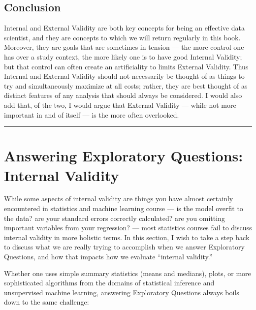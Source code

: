 \documentclass[letterpaper,10pt,english]{jupyterBook}
\begin{document}
\section{Conclusion}
\label{\detokenize{30_questions/15_answering_exploratory_questions:conclusion}}
\sphinxAtStartPar
Internal and External Validity are both key concepts for being an effective data scientist, and they are concepts to which we will return regularly in this book. Moreover, they are goals that are sometimes in tension — the more control one has over a study context, the more likely one is to have good Internal Validity; but that control can often create an artificiality to limits External Validity. Thus Internal and External Validity should not necessarily be thought of as things to try and simultaneously maximize at all costs; rather, they are best thought of as distinct features of any analysis that should always be considered. I would also add that, of the two, I would argue that External Validity — while not more important in and of itself — is the more often overlooked.


\bigskip\hrule\bigskip


\sphinxstepscope


\chapter{Answering Exploratory Questions: Internal Validity}
\label{\detokenize{30_questions/16_exploratory_internal_challenges:answering-exploratory-questions-internal-validity}}\label{\detokenize{30_questions/16_exploratory_internal_challenges::doc}}
\sphinxAtStartPar
While some aspects of internal validity are things you have almost certainly encountered in statistics and machine learning course — is the model overfit to the data? are your standard errors correctly calculated? are you omitting important variables from your regression? — most statistics courses fail to discuss internal validity in more holistic terms. In this section, I wish to take a step back to discuss what we are really trying to accomplish when we answer Exploratory Questions, and how that impacts how we evaluate “internal validity.”

\sphinxAtStartPar
Whether one uses simple summary statistics (means and medians), plots, or more sophisticated algorithms from the domains of statistical inference and unsupervised machine learning, answering Exploratory Questions always boils down to the same challenge:

\sphinxAtStartPar
{}
\end{document}
